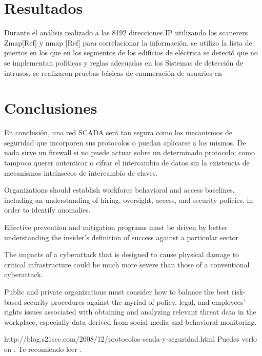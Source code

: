 \documentclass[jou,apacite]{apa6}   %
\begin{document}
\section{Resultados }
Durante el análisis realizado a las 8192 direcciones IP utilizando los scanerers Zmap[Ref] y nmap [Ref] para correlacionar la información, se utilizo la lista de puertos en los que  en los segmentos de los edificios de eléctrica se detectó que no se implementan políticas y reglas adecuadas en los  Sistemas de detección de intrusos, se realizaron pruebas básicas de enumeración de usuarios en 

\section{Conclusiones }
En conclusión, una red SCADA será tan segura como los  mecanismos de seguridad que incorporen sus protocolos o puedan aplicarse a los mismos. De nada sirve un firewall si no puede actuar sobre un determinado protocolo; como tampoco querer autenticar o cifrar el intercambio de datos sin la existencia de mecanismos intrínsecos de intercambio de claves.

Organizations should establish workforce behavioral and access baselines, including
an understanding of hiring, oversight, access, and security policies, in order to identify
anomalies.

Effective prevention and mitigation programs must be driven by better understanding
the insider’s definition of success against a particular sector

The impacts of a cyberattack that is designed to cause physical damage to critical
infrastructure could be much more severe than those of a conventional cyberattack.

Public and private organizations must consider how to balance the best risk-based
security procedures against the myriad of policy, legal, and employees’ rights issues
associated with obtaining and analyzing relevant threat data in the workplace,
especially data derived from social media and behavioral monitoring.

http://blog.s21sec.com/2008/12/protocolos-scada-y-seguridad.html
Puedes verlo en \cite{Patricio2011}. Te recomiendo leer \cite{Patricio2011, Zacarias2009, Alfonso2010b, Alfonso2010a}.



 

\end{document}
